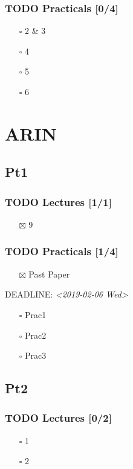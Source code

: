 \documentclass[11pt]{article}
\begin{document}
\subsubsection{{\bfseries\sffamily TODO} Practicals [0/4]}
\label{sec:org39aa3bc}
\begin{itemize}
\item[{$\square$}] 2 \& 3
\item[{$\square$}] 4
\item[{$\square$}] 5
\item[{$\square$}] 6
\end{itemize}
\section{ARIN}
\label{sec:orgbb2d3ea}
\subsection{Pt1}
\label{sec:orgc955190}
\subsubsection{{\bfseries\sffamily TODO} Lectures [1/1]}
\label{sec:org9ebaa06}
\begin{itemize}
\item[{$\boxtimes$}] 9
\end{itemize}
\subsubsection{{\bfseries\sffamily TODO} Practicals [1/4]}
\label{sec:org6e782ac}
\begin{itemize}
\item[{$\boxtimes$}] Past Paper
\end{itemize}
DEADLINE: \textit{<2019-02-06 Wed>}
\begin{itemize}
\item[{$\square$}] Prac1
\item[{$\square$}] Prac2
\item[{$\square$}] Prac3
\end{itemize}
\subsection{Pt2}
\label{sec:org776f736}
\subsubsection{{\bfseries\sffamily TODO} Lectures [0/2]}
\label{sec:org9220f6b}
\begin{itemize}
\item[{$\square$}] 1
\item[{$\square$}] 2
\end{itemize}
\end{document}

